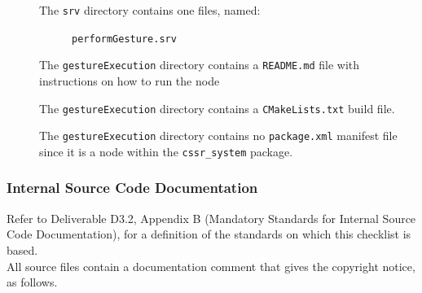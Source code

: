 \documentclass{CSSRforAfrica}
\newcommand{\checkboxChecked}{\fbox{\ding{51}}} %
\begin{document}
\begin{description}
\item[\checkboxChecked] The  {\small \verb+srv+} directory contains one files, named:
\begin{description}
\item[\checkboxChecked] {\small \verb+performGesture.srv+}  
\end{description} 

\item[\checkboxChecked] The {\small \verb+gestureExecution+} directory contains  a {\small \verb+README.md+} file with  instructions on how to run the node 
\item[\checkboxChecked] The {\small \verb+gestureExecution+} directory contains  a {\small \verb+CMakeLists.txt+} build file.
\item[\checkboxChecked] The {\small \verb+gestureExecution+} directory contains  no {\small \verb+package.xml+} manifest file since it is a node within the {\small \verb+cssr_system+} package.

\end{description}


\subsubsection{Internal Source Code Documentation}
\label{subsubsection:gesture_execution_documentation_standards}  
 
Refer to Deliverable D3.2, Appendix B (Mandatory Standards for Internal Source Code Documentation), for a definition of the standards on which this checklist is based.\\

\noindent All source files contain a documentation comment that gives the copyright notice, as follows.
 
\end{document}
